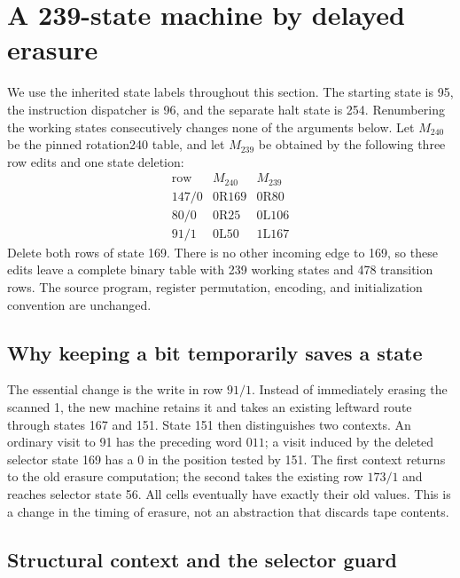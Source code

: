 \section{A 239-state machine by delayed erasure}

We use the inherited state labels throughout this section.  The starting
state is 95, the instruction dispatcher is 96, and the separate halt state
is 254.  Renumbering the working states consecutively changes none of the
arguments below.  Let $M_{240}$ be the pinned rotation240 table, and let
$M_{239}$ be obtained by the following three row edits and one state
deletion:
\[
\begin{array}{c|c|c}
\text{row}&M_{240}&M_{239}\\\hline
147/0&0\mathrm{R}169&0\mathrm{R}80\\
80/0&0\mathrm{R}25&0\mathrm{L}106\\
91/1&0\mathrm{L}50&1\mathrm{L}167
\end{array}
\]
Delete both rows of state 169.  There is no other incoming edge to 169,
so these edits leave a complete binary table with 239 working states and
478 transition rows.  The source program, register permutation, encoding,
and initialization convention are unchanged.

\subsection{Why keeping a bit temporarily saves a state}

The essential change is the write in row $91/1$.  Instead of immediately
erasing the scanned 1, the new machine retains it and takes an existing
leftward route through states 167 and 151.  State 151 then distinguishes
two contexts.  An ordinary visit to 91 has the preceding word $011$;
a visit induced by the deleted selector state 169 has a 0 in the position
tested by 151.  The first context returns to the old erasure computation;
the second takes the existing row $173/1$ and reaches selector state 56.
All cells eventually have exactly their old values.  This is a change in
the timing of erasure, not an abstraction that discards tape contents.

\subsection{Structural context and the selector guard}

